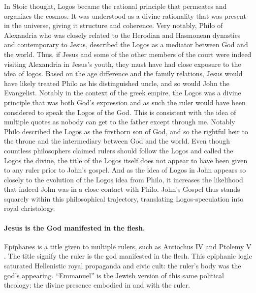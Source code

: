 In Stoic thought, Logos became the rational principle that permeates and organizes the cosmos.
It was understood as a divine rationality that was present in the universe, giving it structure and coherence.
Very notably, Philo of Alexandria who was closely related to the Herodian and Hasmonean dynasties and contemporary to Jesus, described the Logos as a mediator between God and the world.
Thus, if Jesus and some of the other members of the court were indeed visiting Alexandria in Jesus’s youth, they must have had close exposure to the idea of logos.
Based on the age difference and the family relations, Jesus would have likely treated Philo as his distinguished uncle, and so would John the Evangelist.
Notably in the context of the greek empire, the Logos was a divine principle that was both God’s expression and as such the ruler would have been considered to speak the Logos of the God.
This is consistent with the idea of multiple quotes as nobody can get to the father except through me.
Notably Philo described the Logos as the firstborn son of God, and so the rightful heir to the throne and the intermediary between God and the world.
Even though countless philosophers claimed rulers should follow the Logos and called the Logos the divine, the title of the Logos itself does not appear to have been given to any ruler prior to John’s gospel.
And as the idea of Logos in John appears so closely to the evolution of the Logos idea from Philo, it increases the likelihood that indeed John was in a close contact with Philo.
John’s Gospel thus stands squarely within this philosophical trajectory, translating Logos-speculation into royal christology.

\paragraph{Jesus is the God manifested in the flesh.}\label{par:jesus-is-the-god-manifested-in-the-flesh.}
Epiphanes is a title given to multiple rulers, such as Antiochus IV and Ptolemy V .
The title signify the ruler is the god manifested in the flesh.
This epiphanic logic saturated Hellenistic royal propaganda and civic cult: the ruler’s body was the god’s appearing.
“Emmanuel” is the Jewish version of this same political theology: the divine presence embodied in and with the ruler.

